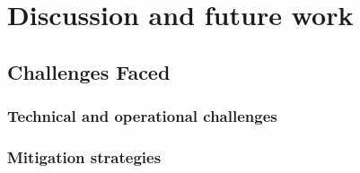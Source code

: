 \chapter{Discussion and future work}

\section{Challenges Faced}
\subsection{Technical and operational challenges}
\subsection{Mitigation strategies}

